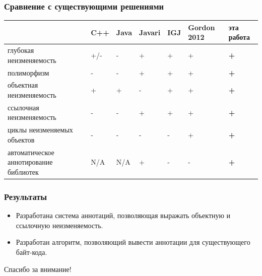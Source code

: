 \documentclass[10pt,pdf,hyperref={unicode}]{beamer}
\begin{document}
\begin{frame}[fragile]
	\transwipe
	\frametitle{Сравнение с существующими решениями}
\begin{center}
	\begin{tabular}{ | p{3.5cm} | p{0.9cm} | p{0.9cm} | p{0.9cm} | p{0.9cm} | p{0.9cm} | p{1.1cm} |}
	\hline  & C++ & Java & Javari & IGJ & Gordon 2012 & \textbf{эта работа} \\
	\hline глубокая неизменяемость & +/- & - & + & + & + & \textbf{+} \\
	\hline полиморфизм & - & - & + & + & + & \textbf{+} \\
	\hline объектная неизменяемость & + & + & - & + & + & \textbf{+} \\	
	\hline ссылочная неизменяемость & - & - & + & + & + & \textbf{+} \\
	\hline циклы неизменяемых объектов & - & - & - & - & + & \textbf{+} \\
	\hline автоматическое аннотирование библиотек & N/A & N/A & + & - & - & \textbf{+} \\
	\hline
    \end{tabular}
\end{center}
\end{frame}




\begin{frame}
	\transwipe
	\frametitle{Результаты}
	\begin{itemize}
	\item
	Разработана система аннотаций, позволяющая выражать объектную и ссылочную неизменяемость.
	\item
	Разработан алгоритм, позволяющий вывести аннотации для существующего байт-кода.	
	\end{itemize}
\end{frame}




\begin{frame}
	\transwipe
\centering
{\huge Спасибо за внимание!}

\end{frame}
\end{document}
